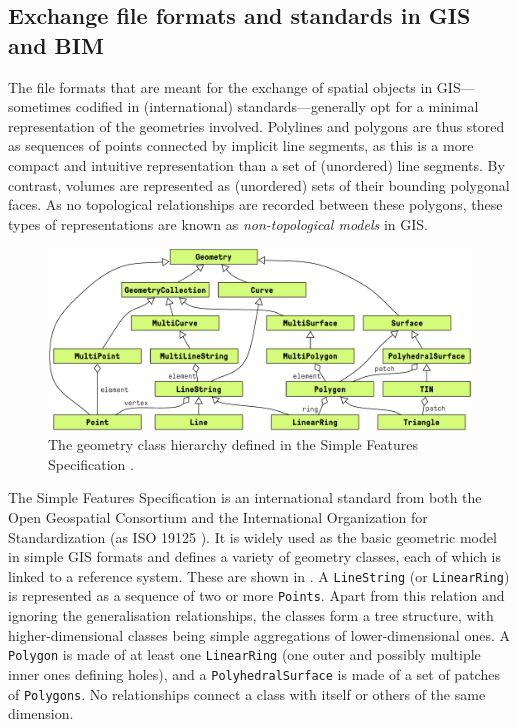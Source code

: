 \subsection{Exchange file formats and standards in GIS and BIM}
\label{ss:formats}

The file formats that are meant for the exchange of spatial objects in GIS---sometimes codified in (international) standards---generally opt for a minimal representation of the geometries involved.
Polylines and polygons are thus stored as sequences of points connected by implicit line segments, as this is a more compact and intuitive representation than a set of (unordered) line segments.
By contrast, volumes are represented as (unordered) sets of their bounding polygonal faces.
As no topological relationships are recorded between these polygons, these types of representations are known as \emph{non-topological models} in GIS.\@

\begin{figure}[tbp]
	\begin{center}
		\includegraphics[width=\linewidth]{figs/sfs}
	\end{center}
	\caption[Geometry in the Simple Features Specification]{The geometry class hierarchy defined in the Simple Features Specification \citep{SimpleFeatures1}.}
\label{fig:sfs}
\end{figure}

The Simple Features Specification \citep{SimpleFeatures1} is an international standard from both the Open Geospatial Consortium and the International Organization for Standardization (as ISO 19125 \citep{ISO19125-1:2006}).
It is widely used as the basic geometric model in simple GIS formats and defines a variety of geometry classes, each of which is linked to a reference system.
These are shown in .
A \texttt{LineString} (or \texttt{LinearRing}) is represented as a sequence of two or more \texttt{Points}.
Apart from this relation and ignoring the generalisation relationships, the classes form a tree structure, with higher-dimensional classes being simple aggregations of lower-dimensional ones.
A \texttt{Polygon} is made of at least one \texttt{LinearRing} (one outer and possibly multiple inner ones defining holes), and a \texttt{PolyhedralSurface} is made of a set of patches of \texttt{Polygons}.
No relationships connect a class with itself or others of the same dimension.

